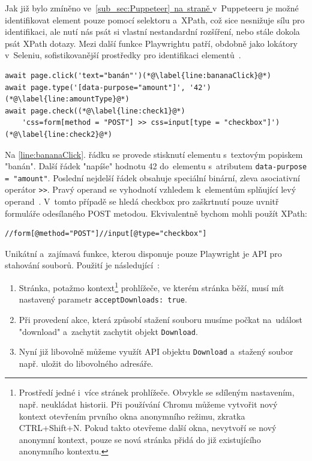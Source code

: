 \documentclass[12pt, a4paper, twoside]{article}
\newcommand{\codefigureSpacing}{1.2}
\newcommand{\refAddedText}[3]{\hyperref[#1]{#2\ref{#1}#3}}
\newcommand{\lineref}[2]{\refAddedText{#1}{}{.~#2}}
\newcommand*{\partialref}[2]{\hyperref[{#1}]{\ref{#2}~na~straně \pageref{#1}}}
\begin{document}
	Jak již bylo zmíněno ve~\partialref{text:puppeteerLocatorSupport}{sub_sec:Puppeteer} v~Puppeteeru je možné identifikovat element pouze pomocí selektoru a~XPath, což sice nesnižuje sílu pro identifikaci, ale nutí nás psát si vlastní nestandardní rozšíření, nebo stále dokola psát XPath dotazy. Mezi další funkce Playwrightu patří, obdobně jako lokátory v~Seleniu, sofistikovanější prostředky pro identifikaci elementů~\cite{playwrightApi}. 
	\begin{codefigure}[H]
		\renewcommand\baselinestretch{\codefigureSpacing}
		\begin{lstlisting}[style=MyJavaScript]
await page.click('text="banán"')(*@\label{line:bananaClick}@*)
await page.type('[data-purpose="amount"]', '42')(*@\label{line:amountType}@*)
await page.check((*@\label{line:check1}@*)
	'css=form[method = "POST"] >> css=input[type = "checkbox"]')(*@\label{line:check2}@*)
		\end{lstlisting}
		\caption{Akce se specificky identifikovanými elementy}
	\end{codefigure}
	Na \ref{line:bananaClick}. řádku se provede stisknutí elementu s~textovým popiskem "banán". Další řádek "napíše" hodnotu 42 do~elementu s~atributem \foreignlanguage{english}{\texttt{data-purpose = "amount"}}. Poslední nejdelší řádek obsahuje speciální binární, zleva asociativní operátor \texttt{>>}. Pravý operand se vyhodnotí vzhledem k~elementům splňující levý operand~\cite{playwrightApi}. V~tomto případě se hledá checkbox pro zaškrtnutí pouze uvnitř formuláře odesílaného POST metodou. Ekvivalentně bychom mohli použít XPath:
	\begin{codefigure}[H]
		\renewcommand\baselinestretch{\codefigureSpacing}
		\begin{lstlisting}[style=MyXPath]
//form[@method="POST"]//input[@type="checkbox"]
		\end{lstlisting}
	\caption{XPath ekvivalentní identikátoru elementu na~\lineref{line:check2}{řádku}}
	\end{codefigure}
	
	Unikátní a~zajímavá funkce, kterou disponuje pouze Playwright je API pro stahování souborů. Použití je následující~\cite{playwrightApi}: 
	\begin{enumerate}
		\item Stránka, potažmo kontext\footnote{Prostředí jedné i~více stránek prohlížeče. Obvykle se sdíleným nastavením, např. neukládat historii. Při používání Chromu můžeme vytvořit nový kontext otevřením prvního okna anonymního režimu, zkratka CTRL+Shift+N. Pokud takto otevřeme další okna, nevytvoří se nový anonymní kontext, pouze se nová stránka přidá do již existujícího anonymního kontextu.} prohlížeče, ve kterém stránka běží, musí mít nastavený parametr \texttt{acceptDownloads: true}.
		\item Při provedení akce, která způsobí stažení souboru musíme počkat na~událost "download" a~zachytit zachytit objekt \texttt{Download}. 
		\item Nyní již libovolně můžeme využít API objektu \texttt{Download} a~stažený soubor např. uložit do libovolného adresáře. 
	\end{enumerate}
\end{document}

